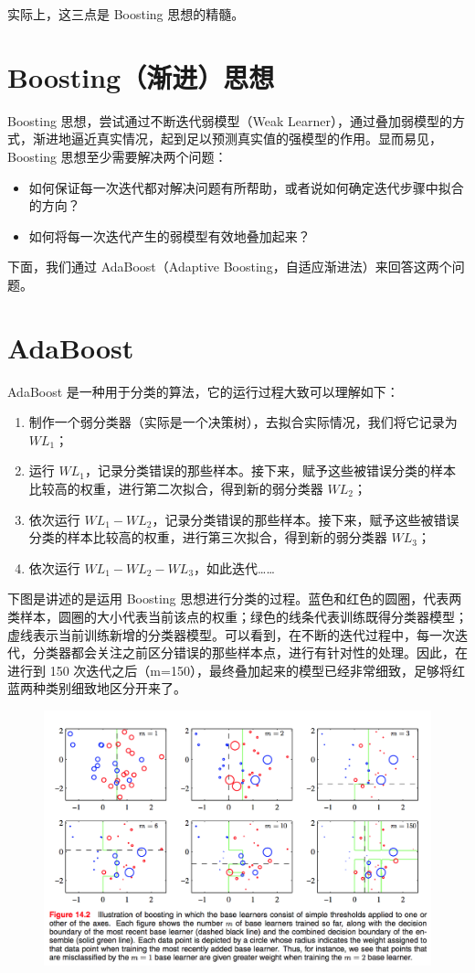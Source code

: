 \documentclass[12pt]{article}
\begin{document}
实际上，这三点是 Boosting 思想的精髓。

\section{Boosting（渐进）思想}
Boosting 思想，尝试通过不断迭代弱模型（Weak Learner），通过叠加弱模型的方式，渐进地逼近真实情况，起到足以预测真实值的强模型的作用。显而易见，Boosting 思想至少需要解决两个问题：
\begin{itemize}
\setlength{\itemsep}{0pt}
\setlength{\parsep}{0pt}
\setlength{\parskip}{0pt}
    \item 如何保证每一次迭代都对解决问题有所帮助，或者说如何确定迭代步骤中拟合的方向？
    \item 如何将每一次迭代产生的弱模型有效地叠加起来？
\end{itemize}

下面，我们通过 AdaBoost（Adaptive Boosting，自适应渐进法）来回答这两个问题。

\section{AdaBoost}
AdaBoost 是一种用于分类的算法，它的运行过程大致可以理解如下：
\begin{enumerate}
\setlength{\itemsep}{0pt}
\setlength{\parsep}{0pt}
\setlength{\parskip}{0pt}
    \item 制作一个弱分类器（实际是一个决策树），去拟合实际情况，我们将它记录为 $WL_1$；
    \item 运行 $WL_1$，记录分类错误的那些样本。接下来，赋予这些被错误分类的样本比较高的权重，进行第二次拟合，得到新的弱分类器 $WL_2$；
    \item 依次运行 $WL_1 - WL_2$，记录分类错误的那些样本。接下来，赋予这些被错误分类的样本比较高的权重，进行第三次拟合，得到新的弱分类器 $WL_3$；
    \item 依次运行 $WL_1 - WL_2 - WL_3$，如此迭代……
\end{enumerate}

下图是讲述的是运用 Boosting 思想进行分类的过程。蓝色和红色的圆圈，代表两类样本，圆圈的大小代表当前该点的权重；绿色的线条代表训练既得分类器模型；虚线表示当前训练新增的分类器模型。可以看到，在不断的迭代过程中，每一次迭代，分类器都会关注之前区分错误的那些样本点，进行有针对性的处理。因此，在进行到 150 次迭代之后（m=150），最终叠加起来的模型已经非常细致，足够将红蓝两种类别细致地区分开来了。
\begin{figure}[H]
\centering
\includegraphics[width=.8\textwidth]{fig/boosting_example.png} 
\end{figure}
\end{document}

